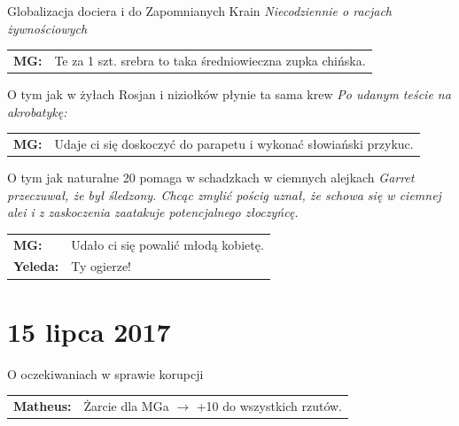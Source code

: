 \documentclass[10pt,twoside,twocolumn]{book}
\begin{document}
\begin{rpg-quotebox}{Globalizacja dociera i do Zapomnianych Krain}
   \textit{Niecodziennie o racjach żywnościowych} \\

   \begin{tabularx}{\columnwidth}{lX}
      \textbf{MG:} & Te za 1 szt. srebra to taka średniowieczna zupka chińska.\\
   \end{tabularx}
\end{rpg-quotebox}


\begin{rpg-quotebox}{O tym jak w żyłach Rosjan i niziołków płynie ta sama krew}
   \textit{Po udanym teście na akrobatykę:}\\

   \begin{tabularx}{\columnwidth}{lX}
      \textbf{MG:} & Udaje ci się doskoczyć do parapetu i wykonać słowiański przykuc.\\
   \end{tabularx}
\end{rpg-quotebox}


\begin{rpg-quotebox}{O tym jak naturalne 20 pomaga w schadzkach w ciemnych alejkach}
   \textit{Garret przeczuwał, że był śledzony. Chcąc zmylić pościg uznał, że schowa się w ciemnej alei i z zaskoczenia zaatakuje potencjalnego złoczyńcę.}\\

   \begin{tabularx}{\columnwidth}{lX}
      \textbf{MG:} & Udało ci się powalić młodą kobietę.\\
      \textbf{Yeleda:} & Ty ogierze!\\
   \end{tabularx}
\end{rpg-quotebox}


\section*{15 lipca 2017}


\begin{rpg-quotebox}{O oczekiwaniach w sprawie korupcji}
   \begin{tabularx}{\columnwidth}{lX}
      \textbf{Matheus:} & Żarcie dla MGa $ \rightarrow $ +10 do wszystkich rzutów.
   \end{tabularx}
\end{rpg-quotebox}
\end{document}
